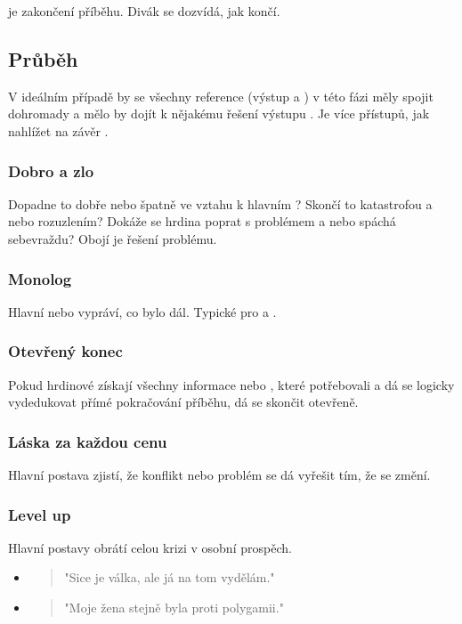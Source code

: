  je zakončení příběhu. Divák se dozvídá, jak  končí. 
 
\subsection{ Průběh }  
V ideálním případě by se všechny  reference (výstup  a ) v této fázi měly spojit dohromady a mělo by dojít k nějakému řešení výstupu . Je více přístupů, jak nahlížet na závěr . 
 
\subsubsection{ Dobro a zlo } Dopadne to dobře nebo špatně ve vztahu k hlavním ? Skončí to katastrofou a nebo rozuzlením? Dokáže se hrdina poprat s problémem a nebo spáchá sebevraždu? Obojí je řešení problému. 
 
\subsubsection{ Monolog } Hlavní  nebo  vypráví, co bylo dál. Typické pro  a . 
 
\subsubsection{ Otevřený konec } Pokud hrdinové získají všechny informace nebo , které potřebovali a dá se logicky vydedukovat přímé pokračování příběhu, dá se skončit otevřeně. 
 
\subsubsection{ Láska za každou cenu } Hlavní postava zjistí, že konflikt nebo problém se dá vyřešit tím, že se změní. 
 
\subsubsection{ Level up } Hlavní postavy obrátí celou krizi v osobní prospěch. 
 
\begin{itemize}
\item  \begin{quote}"Sice je válka, ale já na tom vydělám."\end{quote}
\item  \begin{quote}"Moje žena stejně byla proti polygamii."\end{quote}
\end{itemize}
 
